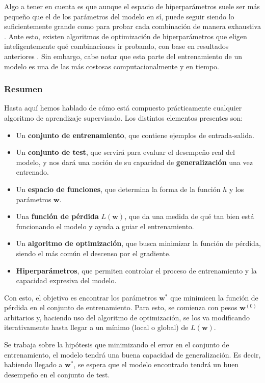 \documentclass[../../main.tex]{subfiles}
\begin{document}
Algo a tener en cuenta es que aunque el espacio de hiperparámetros suele ser más pequeño
que el de los parámetros del modelo en sí, puede seguir siendo lo suficientemente grande
como para probar cada combinación de manera exhaustiva \cite{prince2024understanding}.
Ante esto, existen algoritmos de optimización de hiperparámetros que eligen
inteligentemente qué combinaciones ir probando, con base en resultados anteriores
\cite{prince2024understanding}. Sin embargo, cabe notar que esta parte del entrenamiento
de un modelo es una de las más costosas computacionalmente y en tiempo.

\subsubsection{Resumen}
Hasta aquí hemos hablado de cómo está compuesto prácticamente cualquier algoritmo de
aprendizaje supervisado. Los distintos elementos presentes son:
\begin{itemize}[noitemsep]
    \item Un \textbf{conjunto de entrenamiento}, que contiene ejemplos de entrada-salida.
    \item Un \textbf{conjunto de test}, que servirá para evaluar el desempeño real del modelo,
    y nos dará una noción de su capacidad de \textbf{generalización} una vez entrenado.
    \item Un \textbf{espacio de funciones}, que determina la forma de la función \(h\) y los
    parámetros \(\bm{w}\).
    \item Una \textbf{función de pérdida} \(L(\bm{w})\), que da una medida de qué tan bien
    está funcionando el modelo y ayuda a guiar el entrenamiento.
    \item Un \textbf{algoritmo de optimización}, que busca minimizar la función de pérdida,
    siendo el más común el descenso por el gradiente.
    \item \textbf{Hiperparámetros}, que permiten controlar el proceso de entrenamiento y la
    capacidad expresiva del modelo.
\end{itemize}

Con esto, el objetivo es encontrar los parámetros \(\bm{w}^*\) que minimicen la función de
pérdida en el conjunto de entrenamiento. Para esto, se comienza con pesos \(\bm{w}^{(0)}\)
arbitarios y, haciendo uso del algoritmo de optimización, se los va modificando iterativamente
hasta llegar a un mínimo (local o global) de \(L(\bm{w})\).

Se trabaja sobre la hipótesis que minimizando el error en el conjunto de entrenamiento, el
modelo tendrá una buena capacidad de generalización. Es decir, habiendo llegado a
\(\bm{w}^*\), se espera que el modelo encontrado tendrá un buen desempeño en el
conjunto de test.
\end{document}
